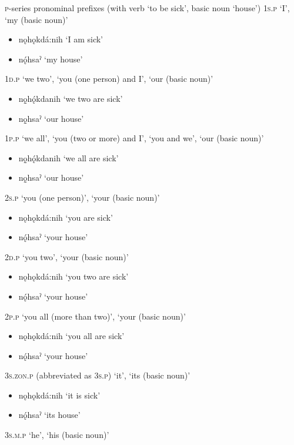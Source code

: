 \ea\label{ex:pplingex100} \textsc{p}-series pronominal prefixes (with verb  ‘to be sick’, basic noun  ‘house’)
\ea \textsc{1s.p} ‘I’, ‘my (basic noun)’
\begin{itemize}
    \item  {}nǫhǫkdá:nih ‘I am sick’
    \item  {}nǫ́hsaˀ ‘my house’
\end{itemize}
\ex \textsc{1d.p} ‘we two’, ‘you (one person) and I’, ‘our (basic noun)’
\begin{itemize}
    \item  {}nǫ̱hǫ́kdanih ‘we two are sick’
    \item  {}nǫ̱hsaˀ ‘our house’
\end{itemize}
\ex \textsc{1p.p} ‘we all’, ‘you (two or more) and I’, ‘you and we’, ‘our (basic noun)’
\begin{itemize}
    \item  {}nǫ̱hǫ́kdanih ‘we all are sick’
    \item  {}nǫ̱hsaˀ ‘our house’
\end{itemize}
\ex \textsc{2s.p} ‘you (one person)’, ‘your (basic noun)’
\begin{itemize}
    \item   {}nǫhǫkdá:nih ‘you are sick’
    \item   {}nǫ́hsaˀ ‘your house’
\end{itemize}
\ex \textsc{2d.p} ‘you two’, ‘your (basic noun)’
\begin{itemize}
    \item   {}nǫhǫkdá:nih ‘you two are sick’
    \item  {}nǫ́hsaˀ ‘your house’
\end{itemize}
\ex \textsc{2p.p} ‘you all (more than two)’, ‘your (basic noun)’
\begin{itemize}
    \item   {}nǫhǫkdá:nih ‘you all are sick’
    \item   {}nǫ́hsaˀ ‘your house’
\end{itemize}
\ex \textsc{3s.zon.p} (abbreviated as \textsc{3s.p}) ‘it’, ‘its (basic noun)’
\begin{itemize}
    \item   {}nǫhǫkdá:nih ‘it is sick’
    \item   {}nǫ́hsaˀ ‘its house’
\end{itemize}
\ex \textsc{3s.m.p} ‘he’, ‘his (basic noun)’
